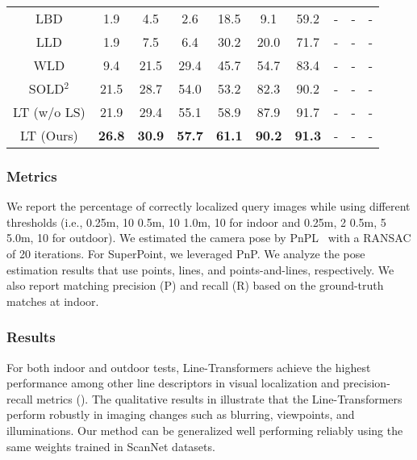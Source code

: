 \documentclass[letterpaper, 10 pt, journal, twoside]{ieeetran}
\begin{document}
\begin{table}[!t]
{\begin{tabular}{cccccccccc}
  LBD                  & 1.9  & 4.5  & 2.6  & 18.5 & 9.1  & 59.2 & - & - & - \\
  LLD                  & 1.9  & 7.5  & 6.4  & 30.2 & 20.0 & 71.7 & - & - & - \\
  WLD                  & 9.4  & 21.5 & 29.4 & 45.7 & 54.7 & 83.4 & - & - & - \\
  SOLD$^2$             & 21.5 & 28.7 & 54.0 & 53.2 & 82.3 & 90.2 & - & - & - \\
  LT (w/o LS)          & 21.9 & 29.4 & 55.1 & 58.9 & 87.9 & 91.7 & - & - & - \\
  LT (Ours) & \textbf{26.8} & \textbf{30.9} & \textbf{57.7} & \textbf{61.1} & \textbf{90.2} & \textbf{91.3} & - & - & - \\\hline
\end{tabular}
}
\vspace{-5mm}
\end{table}



\subsubsection{Metrics}

We report the percentage of correctly localized query images while using different thresholds (i.e., 0.25m, 10\textdegree {\slash} 0.5m, 10\textdegree {\slash} 1.0m, 10\textdegree{} for indoor and 0.25m, 2\textdegree {\slash} 0.5m, 5\textdegree {\slash} 5.0m, 10\textdegree{} for outdoor). We estimated the camera pose by \ac{PnPL}~\cite{Agostinho2019} with a \ac{RANSAC} of 20 iterations. For SuperPoint, we leveraged \ac{PnP}. We analyze the pose estimation results that use points, lines, and points-and-lines, respectively. We also report matching precision (P) and recall (R) based on the ground-truth matches at indoor.



\subsubsection{Results}

For both indoor and outdoor tests, Line-Transformers achieve the highest performance among other line descriptors in visual localization and precision-recall metrics (). The qualitative results in  illustrate that the Line-Transformers perform robustly in imaging changes such as blurring, viewpoints, and illuminations. Our method can be generalized well performing reliably using the same weights trained in ScanNet datasets.
\end{document}
